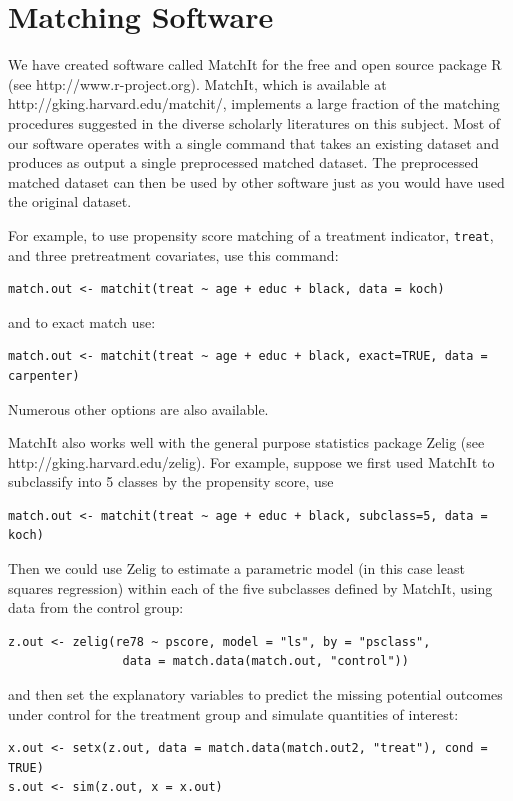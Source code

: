 \documentclass[11pt,titlepage]{article}
\begin{document}
\appendix
\section{Matching Software}\label{s:matchit}

We have created software called MatchIt for the free and open source
package R (see http://www.r-project.org).  MatchIt, which is available
at http://gking.harvard.edu/matchit/, implements a large fraction of
the matching procedures suggested in the diverse scholarly literatures
on this subject.  Most of our software operates with a single command
that takes an existing dataset and produces as output a single
preprocessed matched dataset.  The preprocessed matched dataset can
then be used by other software just as you would have used the
original dataset.

For example, to use propensity score matching of a treatment
indicator, \texttt{treat}, and three pretreatment covariates, use this
command:
\begin{verbatim}
match.out <- matchit(treat ~ age + educ + black, data = koch)
\end{verbatim}
and to exact match use:
\begin{verbatim}
match.out <- matchit(treat ~ age + educ + black, exact=TRUE, data = carpenter)
\end{verbatim}
Numerous other options are also available.

MatchIt also works well with the general purpose statistics package
Zelig (see http://gking.harvard.edu/zelig).  For example, suppose
we first used MatchIt to subclassify into 5 classes by the propensity
score, use
\begin{verbatim}
match.out <- matchit(treat ~ age + educ + black, subclass=5, data = koch)
\end{verbatim}
Then we could use Zelig to estimate a parametric model (in this case
least squares regression) within each of the five subclasses defined
by MatchIt, using data from the control group:
\begin{verbatim}
z.out <- zelig(re78 ~ pscore, model = "ls", by = "psclass", 
                data = match.data(match.out, "control"))
\end{verbatim}
and then set the explanatory variables to predict the missing
potential outcomes under control for the treatment group and simulate
quantities of interest:
\begin{verbatim}
x.out <- setx(z.out, data = match.data(match.out2, "treat"), cond = TRUE)
s.out <- sim(z.out, x = x.out)
\end{verbatim}

\baselineskip 

\end{document}
